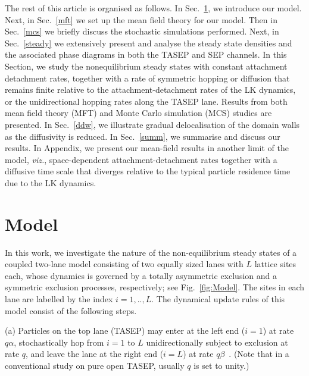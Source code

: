 \documentclass[aps,pre,twocolumn,superscriptaddress,amsmath,amssymb,longbibliography,floatfix,nofootinbib]{revtex4}
\begin{document}

The rest of this article is organised as follows. In Sec.~\ref{model}, we introduce our model. Next, in Sec.~\ref{mft} we set up the mean field theory for our model. Then in Sec.~\ref{mcs} we briefly discuss the stochastic simulations performed. Next, in Sec.~\ref{steady} we extensively present and analyse the steady state densities and the associated phase diagrams in both the TASEP and SEP channels. In this Section, we  study the nonequilibrium steady states with constant attachment detachment rates, together with a rate of symmetric hopping or diffusion that remains finite relative to the attachment-detachment rates of the LK dynamics, or the unidirectional hopping rates along the TASEP lane. Results from both mean field theory (MFT) and Monte Carlo simulation (MCS) studies are presented. In Sec.~\ref{ddw}, we illustrate gradual delocalisation of the domain walls as the diffusivity is reduced. In Sec.~\ref{summ}, we summarise and discuss our results. In Appendix, we present  our mean-field results in another limit of the model, {\em viz.}, space-dependent attachment-detachment rates together with a diffusive time scale that diverges relative to the typical particle residence time due to the LK dynamics.

\section{Model}\label{model}





In this work, we investigate the nature of the non-equilibrium
steady states of a  coupled two-lane model consisting of two equally sized lanes with $L$ 
lattice sites each, whose dynamics is governed by  
a totally asymmetric exclusion and a symmetric exclusion processes, respectively; see Fig.~\ref{fig:Model}. The sites in each lane are labelled by the index $i=1,..,L$. The dynamical update rules of this model consist of the following steps.

(a) {Particles on the top lane  (TASEP) may enter at the left end ($i=1$) at rate $q\alpha$, stochastically hop from $i=1$ to $L$ unidirectionally subject to exclusion at rate $q$, and leave
the lane at the right end ($i=L$) at rate $q\beta$~\cite{sudip-jstat}. (Note that in a conventional study on pure open TASEP, usually $q$ is set to unity.) }
\end{document}
